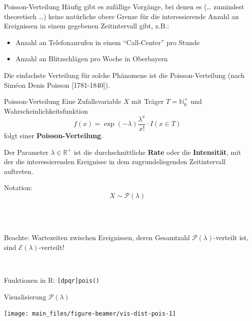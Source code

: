 \documentclass[
  10pt,
  ignorenonframetext,
]{beamer}
\providecommand{\tightlist}{%
  \setlength{\itemsep}{0pt}\setlength{\parskip}{0pt}}
\begin{document}
\begin{frame}{Poisson-Verteilung}
\label{poisson-verteilung}
Häufig gibt es zufällige Vorgänge, bei denen es (\ldots{} zumindest
theoretisch \ldots) keine natürliche obere Grenze für die
interessierende Anzahl an Ereignissen in einem gegebenen Zeitintervall
gibt, z.B.:

\begin{itemize}
\tightlist
\item
  Anzahl an Telefonanrufen in einem ``Call-Center'' pro Stunde\\
\item
  Anzahl an Blitzschlägen pro Woche in Oberbayern
\end{itemize}

Die einfachste Verteilung für solche Phänomene ist die
Poisson-Verteilung (nach Siméon Denis Poisson {[}1781-1840{]}).
\end{frame}

\begin{frame}[fragile]{Poisson-Verteilung}
\label{poisson-verteilung-1}
Eine Zufallsvariable \(X\) mit Träger \({T} = \mathbb{N}^+_0\) und
Wahrscheinlichkeitsfunktion
\[f(x) =\exp(-\lambda) \frac{\lambda^x}{x!} \cdot I(x \in {T})\] folgt
einer \textbf{Poisson-Verteilung}.

Der Parameter \(\lambda \in \mathbb{R}^+\) ist die durchschnittliche
\textbf{Rate} oder die \textbf{Intensität}, mit der die interessierenden
Ereignisse in dem zugrundeliegenden Zeitintervall auftreten.~

Notation: \[X \sim {\mathcal P}(\lambda)\]\\
\strut ~

Beachte: Wartezeiten zwischen Ereignissen, deren Gesamtzahl
\(\mathcal P(\lambda)\)-verteilt ist, sind
\(\mathcal{E}(\lambda)\)-verteilt!\\
\strut ~

Funktionen in R: \texttt{{[}dpqr{]}pois()}
\end{frame}

\begin{frame}{Visualisierung \({\mathcal P}(\lambda)\)}
\label{visualisierung-mathcal-plambda}
\scriptsize

\begin{center}\texttt{[image: main\_files/figure-beamer/vis-dist-pois-1]} \end{center}

\normalsize
\end{frame}
\end{document}
